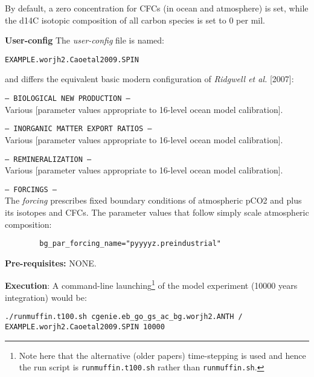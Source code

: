 \documentclass[10pt,twoside]{article}
\begin{document}
\noindent By default, a zero concentration for CFCs (in ocean and atmosphere) is set, while the d14C isotopic composition of all carbon species is set to 0 per mil.

\noindent \textbf{User-config} The \textit{user-config} file is named:
\vspace{-10pt}\begin{verbatim}EXAMPLE.worjh2.Caoetal2009.SPIN\end{verbatim}\vspace{-10pt}
and differs the equivalent basic modern configuration of \textit{Ridgwell et al.} [2007]:

\begin{compactitem}
        
        \item \texttt{--- BIOLOGICAL NEW PRODUCTION ---}
        \\ Various [parameter values appropriate to 16-level ocean model calibration].
        \item \texttt{--- INORGANIC MATTER EXPORT RATIOS ---}
        \\ Various [parameter values appropriate to 16-level ocean model calibration].
        \item \texttt{--- REMINERALIZATION ---}
        \\ Various [parameter values appropriate to 16-level ocean model calibration].
        \item \texttt{--- FORCINGS ---}
        \\ The \textit{forcing} prescribes fixed boundary conditions of atmospheric pCO2 and plus its isotopes and CFCs.
        The parameter values that follow simply scale atmospheric composition:
        \vspace{-5pt}\begin{verbatim}
        bg_par_forcing_name="pyyyyz.preindustrial"
        \end{verbatim}\vspace{-5pt}

\end{compactitem}

\noindent \textbf{Pre-requisites:} NONE.

\noindent \textbf{Execution}: A command-line launching\footnote{Note here that the alternative (older papers) time-stepping is used and hence the run script is \texttt{runmuffin.t100.sh} rather than \texttt{runmuffin.sh}.} of the model experiment (10000 years integration) would be:
\vspace{-10pt}\begin{verbatim}./runmuffin.t100.sh cgenie.eb_go_gs_ac_bg.worjh2.ANTH /
EXAMPLE.worjh2.Caoetal2009.SPIN 10000\end{verbatim}\vspace{-5pt}
\end{document}
